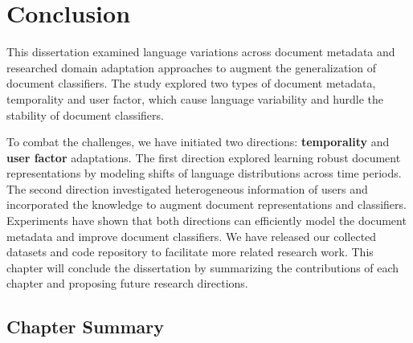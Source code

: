 \chapter{Conclusion}
\label{chp:conclusion}

This dissertation examined language variations across document metadata and researched domain adaptation approaches to augment the generalization of document classifiers.
The study explored two types of document metadata, temporality and user factor, which cause language variability and hurdle the stability of document classifiers.

To combat the challenges, we have initiated two directions: \textbf{temporality} and \textbf{user factor} adaptations.
The first direction explored learning robust document representations by modeling shifts of language distributions across time periods.
The second direction investigated heterogeneous information of users and incorporated the knowledge to augment document representations and classifiers.
Experiments have shown that both directions can efficiently model the document metadata and improve document classifiers.
We have released our collected datasets and code repository to facilitate more related research work.
This chapter will conclude the dissertation by summarizing the contributions of each chapter and proposing future research directions.

\section{Chapter Summary}


